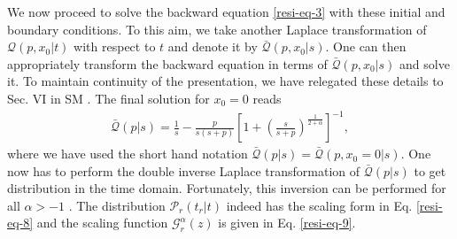 \documentclass[showpacs,amsmath,amssymb,aps,pre,twocolumn,]{revtex4-1}
\def\greenw#1{{\color{black} #1}}
\def\bluew#1{{\color{black} #1}}
\begin{document}
We now proceed to solve the backward equation \eqref{resi-eq-3} with these initial and boundary conditions. To this aim, we take another Laplace transformation of $\mathcal{Q}(p,x_0|t)$ with respect to $t$ and denote it by $\bar{\mathcal{Q}}(p,x_0|s)$. One can then appropriately transform the backward equation in terms of $\bar{\mathcal{Q}}(p,x_0|s)$ and solve it. To maintain continuity of the presentation, we have relegated these details to Sec. VI in SM \cite{Supplementary}. \greenw{The final solution for $x_0 = 0$ reads}
\begin{align}
\bar{\mathcal{Q}}(p|s) = \frac{1}{s}-\frac{p}{s(s+p)} \left[1+ \left( \frac{s}{s+p} \right) ^{\frac{1}{2+\alpha}} \right]^{-1},
\label{resi-eq-7}
\end{align}
where we have used the short hand notation $\bar{\mathcal{Q}}(p|s) = \bar{\mathcal{Q}}(p, x_0=0|s)$. One now has to perform the double inverse Laplace transformation of $\bar{\mathcal{Q}}(p|s)$ to get distribution in the time domain. \greenw{Fortunately, this inversion can be performed for all $\alpha>-1$ \bluew{\cite{Lamperti58, Carmi2010}}.} The distribution $\mathcal{P}_r(t_r|t)$ indeed has the scaling form in Eq. \eqref{resi-eq-8} and the scaling function $\mathcal{G} _{r}^{\alpha} \left( z \right)$ is given in Eq. \eqref{resi-eq-9}.
\end{document}
